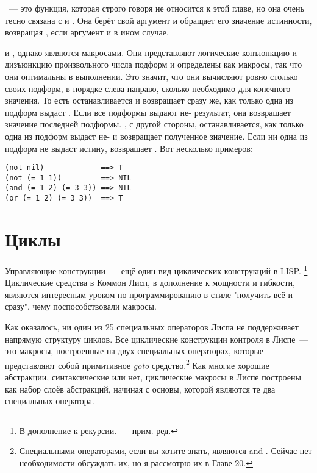 ~--- это функция, которая строго говоря не относится к этой главе, но она очень
тесно связана с  и . Она берёт свой аргумент и обращает его значение
истинности, возвращая , если аргумент  и  в ином случае.

 и , однако являются макросами. Они представляют логические конъюнкцию
и дизъюнкцию произвольного числа подформ и определены как макросы, так что они оптимальны
в выполнении. Это значит, что они вычисляют ровно столько своих подформ, в порядке слева
направо, сколько необходимо для конечного значения. То есть  останавливается и
возвращает  сразу же, как только одна из подформ выдаст . Если все
подформы выдают не- результат, она возвращает значение последней
подформы. , с другой стороны, останавливается, как только одна из подформ выдаст
не- и возвращает полученное значение. Если ни одна из подформ не выдаст истину,
 возвращает . Вот несколько примеров:

\begin{lstlisting}
(not nil)             ==> T
(not (= 1 1))         ==> NIL
(and (= 1 2) (= 3 3)) ==> NIL
(or (= 1 2) (= 3 3))  ==> T
\end{lstlisting}

\section{Циклы}

Управляющие конструкции~--- ещё один вид циклических конструкций в LISP. \footnote{В
  дополнение к рекурсии.~--- прим. ред.} Циклические средства в Коммон Лисп, в дополнение к
мощности и гибкости, являются интересным уроком по программированию в стиле "получить всё
и сразу", чему поспособствовали макросы.

Как оказалось, ни один из 25 специальных операторов Лиспа не поддерживает напрямую
структуру циклов. Все циклические конструкции контроля в Лиспе~--- это макросы, построенные
на двух специальных операторах, которые представляют собой примитивное \textit{goto}
средство.\footnote{Специальными операторами, если вы хотите знать, являются 
  and . Сейчас нет необходимости обсуждать их, но я рассмотрю их в Главе 20.} Как
многие хорошие абстракции, синтаксические или нет, циклические макросы в Лиспе построены
как набор слоёв абстракций, начиная с основы, которой являются те два специальных
оператора.

